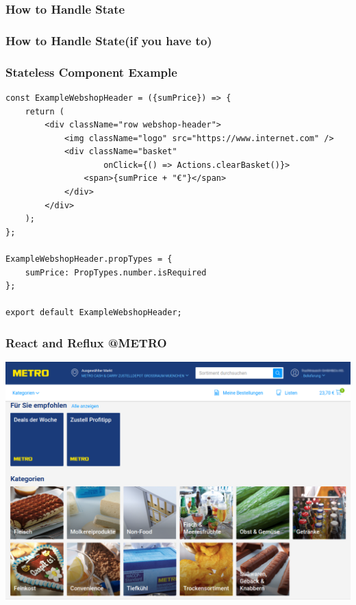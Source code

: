\documentclass{beamer}
\begin{document}
\begin{frame}\frametitle{How to Handle State}
\centering
{}
\end{frame}

\begin{frame}\frametitle{How to Handle State\newline(if you have to)}
\begin{itemize}
\end{itemize}
\end{frame}

\begin{frame}[fragile]\frametitle{Stateless Component \textendash{} Example}
\begin{lstlisting}[style=htmlcssjs]
const ExampleWebshopHeader = ({sumPrice}) => {
    return (
        <div className="row webshop-header">
            <img className="logo" src="https://www.internet.com" />
            <div className="basket" 
                    onClick={() => Actions.clearBasket()}>
                <span>{sumPrice + "€"}</span>
            </div>
        </div>
    );
};

ExampleWebshopHeader.propTypes = {
    sumPrice: PropTypes.number.isRequired
};

export default ExampleWebshopHeader;
\end{lstlisting}
\end{frame}

\begin{frame}\frametitle{React and Reflux @METRO}
\centering
\includegraphics[width=.85\linewidth,height=.85\textheight,keepaspectratio]{pics/betty.png}
\end{frame}
\end{document}

